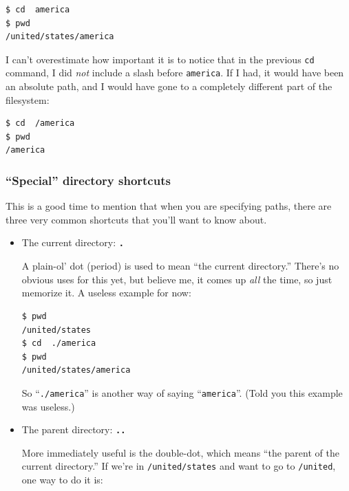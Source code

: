 \begin{enumerate}
\begin{Verbatim}[fontsize=\small]
$ cd  america
$ pwd
/united/states/america
\end{Verbatim}

I can't overestimate how important it is to notice that in the previous
\texttt{cd} command, I did \textit{not} include a slash before
\texttt{america}. If I had, it would have been an absolute path, and I would
have gone to a completely different part of the filesystem:

\begin{Verbatim}[fontsize=\small]
$ cd  /america
$ pwd
/america
\end{Verbatim}

\subsubsection{``Special'' directory shortcuts}

This is a good time to mention that when you are specifying paths, there are
three very common shortcuts that you'll want to know about.


\begin{itemize}
\itemsep1em

\item The current directory: \texttt{\textbf{.}}

A plain-ol' dot (period) is used to mean ``the current directory.'' There's no
obvious uses for this yet, but believe me, it comes up \textit{all} the time,
so just memorize it. A useless example for now:

\begin{Verbatim}[fontsize=\small]
$ pwd
/united/states
$ cd  ./america
$ pwd
/united/states/america
\end{Verbatim}

So ``\texttt{./america}'' is another way of saying ``\texttt{america}''. (Told
you this example was useless.)

\item The parent directory: \texttt{\textbf{..}}

More immediately useful is the double-dot, which means ``the parent of the
current directory.'' If we're in \texttt{/united/states} and want to go to
\texttt{/united}, one way to do it is:


\end{itemize}
\end{enumerate}
